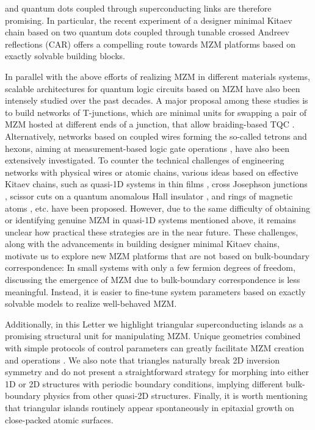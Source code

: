 \documentclass[aps,prb,twocolumn,showpacs,amsmath,amssymb,superscriptaddress]{revtex4-2}
\begin{document}
and quantum dots coupled through superconducting links \cite{sauRealizingRobustPractical2012,leijnseParityQubitsPoor2012,dvirRealizationMinimalKitaev2023} are therefore promising. In particular, the recent experiment \cite{dvirRealizationMinimalKitaev2023} of a designer minimal Kitaev chain based on two quantum dots coupled through tunable crossed Andreev reflections (CAR) offers a compelling route towards MZM platforms based on exactly solvable building blocks.

In parallel with the above efforts of realizing MZM in different materials systems, scalable architectures for quantum logic circuits based on MZM have also been intensely studied over the past decades. A major proposal among these studies is to build networks of T-junctions, which are minimal units for swapping a pair of MZM hosted at different ends of a junction, that allow braiding-based TQC \cite{aasenMilestonesMajoranaBasedQuantum2016}. Alternatively, networks based on coupled wires forming the so-called tetrons and hexons, aiming at measurement-based logic gate operations  \cite{karzigScalableDesignsQuasiparticlepoisoningprotected2017}, have also been extensively investigated. To counter the technical challenges of engineering networks with physical wires or atomic chains, various ideas based on effective Kitaev chains, such as quasi-1D systems in thin films \cite{potterMultichannelGeneralizationKitaev2010}, cross Josephson junctions \cite{zhouPhaseControlMajorana2020}, scissor cuts on a quantum anomalous Hall insulator \cite{xieCreatingLocalizedMajorana2021}, and rings of magnetic atoms \cite{liManipulatingMajoranaZero2016}, etc. have been proposed. However, due to the same difficulty of obtaining or identifying genuine MZM in quasi-1D systems mentioned above, it remains unclear how practical these strategies are in the near future. These challenges, along with the advancements in building designer minimal Kitaev chains, motivate us to explore new MZM platforms that are not based on bulk-boundary correspondence: In small systems with only a few fermion degrees of freedom, discussing the emergence of MZM due to bulk-boundary correspondence is less meaningful. Instead, it is easier to fine-tune system parameters based on exactly solvable models to realize well-behaved MZM.

Additionally, in this Letter we highlight triangular superconducting islands as a promising structural unit for manipulating MZM. Unique geometries combined with simple protocols of control parameters can greatly facilitate MZM creation and operations \cite{liManipulatingMajoranaZero2016, pahomiBraidingMajoranaCorner2020, zhangsb_2020_1, zhangsb_2020_2}. We also note that triangles naturally break 2D inversion symmetry and do not present a straightforward strategy for morphing into either 1D or 2D structures with periodic boundary conditions, implying different bulk-boundary physics from other quasi-2D structures. Finally, it is worth mentioning that triangular islands routinely appear spontaneously in epitaxial growth \cite{pietzschSpinResolvedElectronicStructure2006} on close-packed atomic surfaces.
\end{document}
